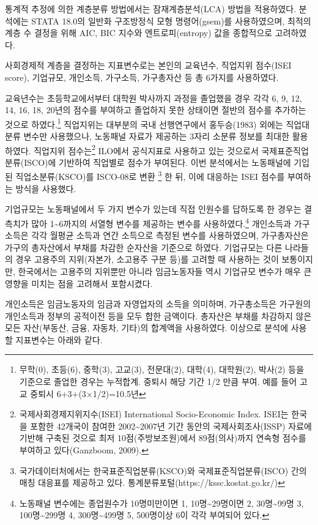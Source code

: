 \documentclass[
  letterpaper,
  DIV=11,
  numbers=noendperiod]{scrartcl}
\begin{document}
통계적 추정에 의한 계층분류 방법에서는 잠재계층분석(LCA) 방법을
적용하였다. 분석에는 STATA 18.0의 일반화 구조방정식 모형 명령어(gsem)를
사용하였으며, 최적의 계층 수 결정을 위해 AIC, BIC 지수와
엔트로피(entropy) 값을 종합적으로 고려하였다.

사회경제적 계층을 결정하는 지표변수로는 본인의 교육년수, 직업지위
점수(ISEI score), 기업규모, 개인소득, 가구소득, 가구총자산 등 총 6가지를
사용하였다.

교육년수는 초등학교에서부터 대학원 박사까지 과정을 졸업했을 경우 각각 6,
9, 12, 14, 16, 18, 20년의 점수를 부여하고 졸업하지 못한 상태이면 절반의
점수를 추가하는 것으로 하였다.\footnote{무학(0), 초등(6), 중학(3),
  고교(3), 전문대(2), 대학(4), 대학원(2), 박사(2) 등을 기준으로 졸업한
  경우는 누적합계. 중퇴시 해당 기간 1/2 만큼 부여. 예를 들어 고교 중퇴시
  6+3+(3×1/2)=10.5년} 직업지위는 대부분의 국내 선행연구에서 홍두승(1983)
외에는 직업대분류 변수만 사용했으나, 노동패널 자료가 제공하는 3자리
소분류 정보를 최대한 활용하였다. 직업지위 점수는\footnote{국제사회경제지위지수(ISEI)
  International Socio-Economic Index. ISEI는 한국을 포함한 42개국이
  참여한 2002\textasciitilde2007년 기간 동안의 국제사회조사(ISSP) 자료에
  기반해 구축된 것으로 최저 10점(주방보조원)에서 89점(의사)까지 연속형
  점수를 부여하고 있다(Ganzboom, 2009).} ILO에서 공식지표로 사용하고
있는 것으로서 국제표준직업분류(ISCO)에 기반하여 직업별로 점수가
부여된다. 이번 분석에서는 노동패널에 기입된 직업소분류(KSCO)를 ISCO-08로
변환 \footnote{국가데이터처에서는 한국표준직업분류(KSCO)와
  국제표준직업분류(ISCO) 간의 매칭 대응표를 제공하고 있다.
  통계분류포털(https://kssc.kostat.go.kr/)} 한 뒤, 이에 대응하는 ISEI
점수를 부여하는 방식을 사용했다.

기업규모는 노동패널에서 두 가지 변수가 있는데 직접 인원수를 답하도록 한
경우는 결측치가 많아 1\textasciitilde6까지의 서열형 변수를 제공하는
변수를 사용하였다.\footnote{노동패널 변수에는 종업원수가 10명미만이면 1,
  10명\textasciitilde29명이면 2, 30명\textasciitilde99명 3,
  100명\textasciitilde299명 4, 300명\textasciitilde499명 5, 500명이상
  6이 각각 부여되어 있다.} 개인소득과 가구소득은 각각 월평균 소득과 연간
소득으로 측정된 변수를 사용하였으며, 가구총자산은 가구의 총자산에서
부채를 차감한 순자산을 기준으로 하였다. 기업규모는 다른 나라들의 경우
고용주의 지위(자본가, 소고용주 구분 등)를 고려할 때 사용하는 것이
보통이지만, 한국에서는 고용주의 지위뿐만 아니라 임금노동자들 역시
기업규모 변수가 매우 큰 영향을 미치는 점을 고려해서 포함시켰다.

개인소득은 임금노동자의 임금과 자영업자의 소득을 의미하며, 가구총소득은
가구원의 개인소득과 정부의 공적이전 등을 모두 합한 금액이다. 총자산은
부채를 차감하지 않은 모든 자산(부동산, 금융, 자동차, 기타)의 합계액을
사용하였다. 이상으로 분석에 사용할 지표변수는 아래와 같다.
\end{document}
